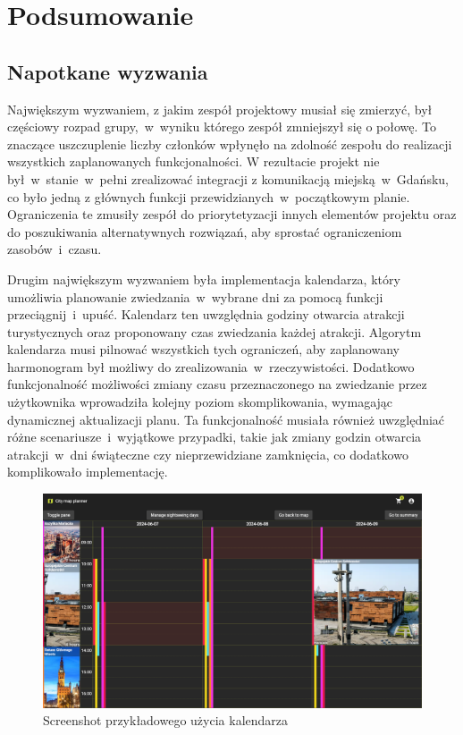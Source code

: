
\chapter{Podsumowanie}
\label{ch:podsumowanie}

\section{Napotkane wyzwania}
\label{sec:napotkane-wyzwania}

Największym wyzwaniem, z jakim zespół projektowy musiał się zmierzyć, był częściowy rozpad grupy,~w~wyniku którego zespół zmniejszył się o połowę.
To znaczące uszczuplenie liczby członków wpłynęło na zdolność zespołu do realizacji wszystkich zaplanowanych funkcjonalności.\newline
W rezultacie projekt nie był~w~stanie~w~pełni zrealizować integracji z komunikacją miejską~w~Gdańsku, co było jedną z głównych funkcji przewidzianych~w~początkowym planie.
Ograniczenia te zmusiły zespół do priorytetyzacji innych elementów projektu oraz do poszukiwania alternatywnych rozwiązań, aby sprostać ograniczeniom zasobów~i~czasu.

Drugim największym wyzwaniem była implementacja kalendarza, który umożliwia planowanie zwiedzania~w~wybrane dni za pomocą funkcji przeciągnij~i~upuść.
Kalendarz ten uwzględnia godziny otwarcia atrakcji turystycznych oraz proponowany czas zwiedzania każdej atrakcji.
Algorytm kalendarza musi pilnować wszystkich tych ograniczeń, aby zaplanowany harmonogram był możliwy do zrealizowania~w~rzeczywistości.
Dodatkowo funkcjonalność  możliwości zmiany czasu przeznaczonego na zwiedzanie przez użytkownika wprowadziła kolejny poziom skomplikowania, wymagając dynamicznej aktualizacji planu.
Ta funkcjonalność musiała również uwzględniać różne scenariusze~i~wyjątkowe przypadki, takie jak zmiany godzin otwarcia atrakcji~w~dni świąteczne czy nieprzewidziane zamknięcia, co dodatkowo komplikowało implementację.

\begin{figure}[H]
    \centering
    \includegraphics[width=1\textwidth]{attachments/t1}
    \caption{Screenshot przykładowego użycia kalendarza}
\end{figure}

